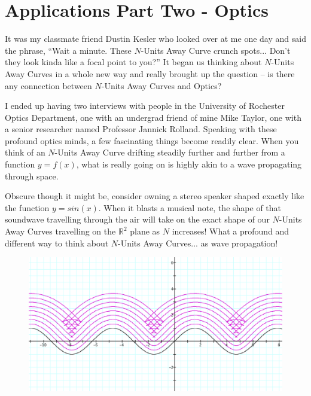 \section{Applications Part Two - Optics}

It was my classmate friend Dustin Kesler who looked over at me one day and said the phrase, ``Wait a minute. These $N$-Units Away Curve crunch spots... Don’t they look kinda like a focal point to you?'' It began us thinking about $N$-Units Away Curves in a whole new way and really brought up the question – is there any connection between $N$-Units Away Curves and Optics?

I ended up having two interviews with people in the University of Rochester Optics Department, one with an undergrad friend of mine Mike Taylor, one with a senior researcher named Professor Jannick Rolland. Speaking with these profound optics minds, a few fascinating things become readily clear. When you think of an $N$-Units Away Curve drifting steadily further and further from a function $y = f(x)$, what is really going on is highly akin to a wave propagating through space.

Obscure though it might be, consider owning a stereo speaker shaped exactly like the function $y = sin(x)$. When it blasts a musical note, the shape of that soundwave travelling through the air will take on the exact shape of our $N$-Units Away Curves travelling on the $\mathbb{R}^2$ plane as $N$ increases! What a profound and different way to
think about $N$-Units Away Curves... as wave propagation!

\begin{figure}[h!]
  \begin{minipage}[b]{\linewidth}
      \centering
      \includegraphics[width=\linewidth]{application-img/app 4.png}
      \caption{}
      \label{fig:app4}
  \end{minipage}
\end{figure}

